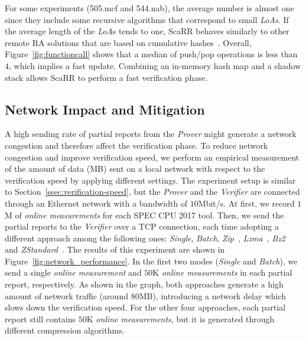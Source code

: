 For some experiments (\ie 505.mcf and 544.nab), the average number is almost 
one since they include some recursive algorithms that correspond to small 
\emph{LoAs}. If the average length of the \emph{LoA}s tends to one, ScaRR 
behaves similarly to other remote RA solutions that are based on cumulative 
hashes~\citep{abera2016c,aberadiat}. Overall, Figure~\ref{fig:functioncall} 
shows that a median of push/pop operations is less than $4$, which implies a 
fast update.
Combining an in-memory hash map and a shadow stack allows ScaRR to perform a 
fast verification phase.


\subsection{Network Impact and Mitigation}
\label{ssec:network-impact}
A high sending rate of partial reports from the \emph{Prover}
might generate a network congestion and therefore affect the verification phase.
To reduce network congestion and improve verification speed, we perform an 
empirical measurement of 
the amount of data (\ie MB) sent on a local network with respect to the 
verification speed by applying different settings.
The experiment setup is similar to Section~\ref{ssec:verification-speed}, but 
the \emph{Prover} and the \emph{Verifier} are connected through an Ethernet 
network with a bandwidth of $10$Mbit/s.
At first, we record $1$M of \emph{online measurements} for each SPEC CPU 2017 
tool.
Then, we send the partial reports to the \emph{Verifier} over a TCP connection,
each time adopting a different approach among the following ones:
\emph{Single}, \emph{Batch}, \emph{Zip}~\citep{zip}, \emph{Lzma}~\citep{lzma}, 
\emph{Bz2}~\citep{bz2} and \emph{ZStandard}~\citep{zstandard}. 
The results of this experiment are shown in 
Figure~\ref{fig:network_performance}. 
In the first two modes (\ie \emph{Single} and  \emph{Batch}),
we send a single \emph{online measurement} and $50$K
\emph{online measurements} in each partial report, respectively.
As shown in the graph, both approaches generate a high amount of network 
traffic (around $80$MB),
introducing a network delay which slows down the verification speed.
For the other four approaches, each partial report still contains $50$K 
\emph{online measurements},
but it is generated through different compression algorithms.
